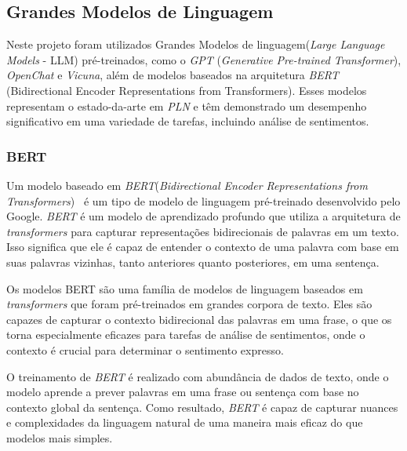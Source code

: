 \subsection{Grandes Modelos de Linguagem}
\label{cap:fund_teorica:sec:modelos}


Neste projeto foram utilizados Grandes Modelos de linguagem(\textit{Large Language Models} - LLM) pré-treinados, como o \textit{GPT} (\textit{Generative Pre-trained Transformer}), \textit{OpenChat} e \textit{Vicuna}, além de modelos baseados na arquitetura \textit{BERT} (Bidirectional Encoder Representations from Transformers)\cite{hugoZanini2021mediu}. Esses modelos representam o estado-da-arte em \textit{PLN} e têm demonstrado um desempenho significativo em uma variedade de tarefas, incluindo análise de sentimentos.

\subsubsection[BERT]{BERT}
\label{cap:fund_teorica:sec:modelos:subsec:bert}

Um modelo baseado em \textit{BERT}(\textit{Bidirectional Encoder Representations from Transformers})~\cite{devlin2019bert} é um tipo de modelo de linguagem pré-treinado desenvolvido pelo Google. \textit{BERT} é um modelo de aprendizado profundo que utiliza a arquitetura de \textit{transformers} para capturar representações bidirecionais de palavras em um texto. Isso significa que ele é capaz de entender o contexto de uma palavra com base em suas palavras vizinhas, tanto anteriores quanto posteriores, em uma sentença.

Os modelos BERT são uma família de modelos de linguagem baseados em \textit{transformers} que foram pré-treinados em grandes corpora de texto. Eles são capazes de capturar o contexto bidirecional das palavras em uma frase, o que os torna especialmente eficazes para tarefas de análise de sentimentos, onde o contexto é crucial para determinar o sentimento expresso.

O treinamento de \textit{BERT} é realizado com abundância de dados de texto, onde o modelo aprende a prever palavras em uma frase ou sentença com base no contexto global da sentença. Como resultado, \textit{BERT} é capaz de capturar nuances e complexidades da linguagem natural de uma maneira mais eficaz do que modelos mais simples.

